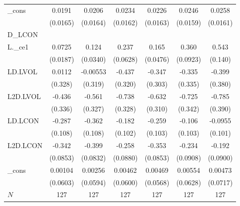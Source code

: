 \begin{table}
\begin{center}
{\begin{tabular}{l*{6}{c}}
\_cons    &   0.0191         &   0.0206         &   0.0234         &   0.0226         &   0.0246         &   0.0258         \\
          & (0.0165)         & (0.0164)         & (0.0162)         & (0.0163)         & (0.0159)         & (0.0161)         \\
\hline
D\_LCON    &                  &                  &                  &                  &                  &                  \\
L.\_ce1    &   0.0725\sym{***}&    0.124\sym{***}&    0.237\sym{***}&    0.165\sym{***}&    0.360\sym{***}&    0.543\sym{***}\\
          & (0.0187)         & (0.0340)         & (0.0628)         & (0.0476)         & (0.0923)         &  (0.140)         \\
LD.LVOL   &   0.0112         & -0.00553         &   -0.437         &   -0.347         &   -0.335         &   -0.399         \\
          &  (0.328)         &  (0.319)         &  (0.320)         &  (0.303)         &  (0.335)         &  (0.380)         \\
L2D.LVOL  &   -0.436         &   -0.561\sym{+}  &   -0.738\sym{*}  &   -0.632\sym{*}  &   -0.725\sym{*}  &   -0.785\sym{*}  \\
          &  (0.336)         &  (0.327)         &  (0.328)         &  (0.310)         &  (0.342)         &  (0.390)         \\
LD.LCON   &   -0.287\sym{**} &   -0.362\sym{***}&   -0.182\sym{+}  &   -0.259\sym{*}  &   -0.106         &  -0.0955         \\
          &  (0.108)         &  (0.108)         &  (0.102)         &  (0.103)         &  (0.103)         &  (0.101)         \\
L2D.LCON  &   -0.342\sym{***}&   -0.399\sym{***}&   -0.258\sym{**} &   -0.353\sym{***}&   -0.234\sym{*}  &   -0.192\sym{*}  \\
          & (0.0853)         & (0.0832)         & (0.0880)         & (0.0853)         & (0.0908)         & (0.0900)         \\
\_cons    &  0.00104         &  0.00256         &  0.00462         &  0.00469         &  0.00554         &  0.00473         \\
          & (0.0603)         & (0.0594)         & (0.0600)         & (0.0568)         & (0.0628)         & (0.0717)         \\
\hline
\(N\)     &      127         &      127         &      127         &      127         &      127         &      127         \\

\end{tabular}}
\end{center}
\end{table}
